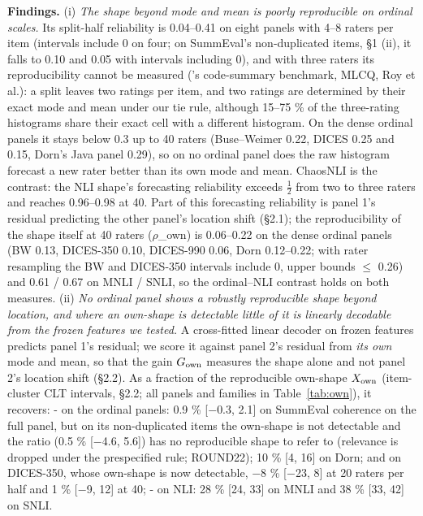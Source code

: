 \documentclass[10pt]{article}
\begin{document}
\textbf{Findings.} (i) \emph{The shape beyond mode and mean is poorly reproducible on ordinal scales.} Its split-half reliability is 0.04--0.41 on eight panels with 4--8 raters per item (intervals include 0 on four; on SummEval's non-duplicated items, \S{}1 (ii), it falls to 0.10 and 0.05 with intervals including 0), and with three raters its reproducibility cannot be measured (\citet{crupi2025effectiveness}'s code-summary benchmark, MLCQ, Roy et al.): a split leaves two ratings per item, and two ratings are determined by their exact mode and mean under our tie rule, although 15--75 \% of the three-rating histograms share their exact cell with a different histogram. On the dense ordinal panels it stays below 0.3 up to 40 raters (Buse--Weimer 0.22, DICES 0.25 and 0.15, Dorn's Java panel 0.29), so on no ordinal panel does the raw histogram forecast a new rater better than its own mode and mean. ChaosNLI is the contrast: the NLI shape's forecasting reliability exceeds $\tfrac12$ from two to three raters and reaches 0.96--0.98 at 40. Part of this forecasting reliability is panel 1's residual predicting the other panel's location shift (\S{}2.1); the reproducibility of the shape itself at 40 raters ($\rho$\_own) is 0.06--0.22 on the dense ordinal panels (BW 0.13, DICES-350 0.10, DICES-990 0.06, Dorn 0.12--0.22; with rater resampling the BW and DICES-350 intervals include 0, upper bounds $\leq$ 0.26) and 0.61 / 0.67 on MNLI / SNLI, so the ordinal--NLI contrast holds on both measures. (ii) \emph{No ordinal panel shows a robustly reproducible shape beyond location, and where an own-shape is detectable little of it is linearly decodable from the frozen features we tested.} A cross-fitted linear decoder on frozen features predicts panel 1's residual; we score it against panel 2's residual from \emph{its own} mode and mean, so that the gain \(G_{\rm own}\) measures the shape alone and not panel 2's location shift (\S{}2.2). As a fraction of the reproducible own-shape \(X_{\rm own}\) (item-cluster CLT intervals, \S{}2.2; all panels and families in Table~\ref{tab:own}), it recovers: - on the ordinal panels: 0.9 \% {[}$-$0.3, 2.1{]} on SummEval coherence on the full panel, but on its non-duplicated items the own-shape is not detectable and the ratio (0.5 \% {[}$-$4.6, 5.6{]}) has no reproducible shape to refer to (relevance is dropped under the prespecified rule; ROUND22); 10 \% {[}4, 16{]} on Dorn; and on DICES-350, whose own-shape is now detectable, $-$8 \% {[}$-$23, 8{]} at 20 raters per half and 1 \% {[}$-$9, 12{]} at 40; - on NLI: 28 \% {[}24, 33{]} on MNLI and 38 \% {[}33, 42{]} on SNLI.
\end{document}
